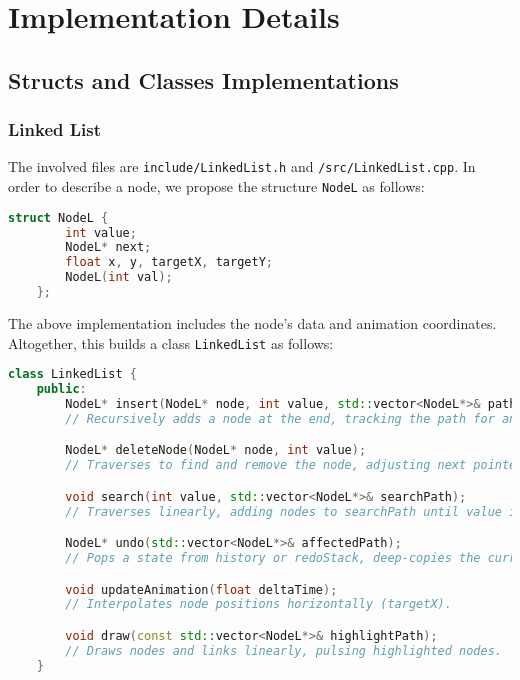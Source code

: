 \documentclass{article}
\begin{document}
\section{Implementation Details}
\subsection{Structs and Classes Implementations}
\subsubsection{Linked List}
The involved files are \lstinline|include/LinkedList.h| and \lstinline|/src/LinkedList.cpp|. In order to describe a node, we propose the structure \lstinline|NodeL| as follows:
\begin{lstlisting}[language=c++]
	struct NodeL {
		int value;
		NodeL* next;
		float x, y, targetX, targetY;
		NodeL(int val);
	};
\end{lstlisting}
The above implementation includes the node's data and animation coordinates. Altogether, this builds a class \lstinline|LinkedList| as follows:
\begin{lstlisting}[language=c++]
	class LinkedList {
	public:
		NodeL* insert(NodeL* node, int value, std::vector<NodeL*>& path);
		// Recursively adds a node at the end, tracking the path for animation (O(n)).

		NodeL* deleteNode(NodeL* node, int value);
		// Traverses to find and remove the node, adjusting next pointers (O(n)).

		void search(int value, std::vector<NodeL*>& searchPath);
		// Traverses linearly, adding nodes to searchPath until value is found (O(n)).

		NodeL* undo(std::vector<NodeL*>& affectedPath);
		// Pops a state from history or redoStack, deep-copies the current state, and restores the previous/next state.

		void updateAnimation(float deltaTime);
		// Interpolates node positions horizontally (targetX).

		void draw(const std::vector<NodeL*>& highlightPath);
		// Draws nodes and links linearly, pulsing highlighted nodes.
	}
\end{lstlisting}
\end{document}
